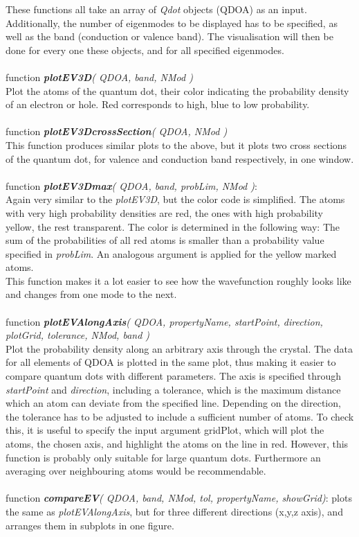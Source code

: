 These functions all take an array of \textit{Qdot} objects (QDOA) as an input. Additionally, the number of eigenmodes to be displayed has to be specified, as well as the band (conduction or valence band). The visualisation will then be done for every one these objects, and for all specified eigenmodes.
\\\\
function \textit{\textbf{plotEV3D}( QDOA, band, NMod )} \\
Plot the atoms of the quantum dot, their color indicating the probability density of an electron or hole. Red corresponds to high, blue to low probability.
\\\\
function \textit{\textbf{plotEV3DcrossSection}( QDOA, NMod ) }\\
This function produces similar plots to the above, but it plots two cross sections of the quantum dot, for valence and conduction band respectively, in one window.
\\\\
function \textit{\textbf{plotEV3Dmax}( QDOA, band, probLim, NMod )}: \\
Again very similar to the \textit{plotEV3D}, but the color code is simplified. The atoms with very high probability densities are red, the ones with high probability yellow, the rest transparent. The color is determined in the following way: The sum of the probabilities of all red atoms is smaller than a probability value specified in \textit{probLim}. An analogous argument is applied for the yellow marked atoms.\\
This function makes it a lot easier to see how the wavefunction roughly looks like and changes from one mode to the next. 
\\\\
function \textit{\textbf{plotEVAlongAxis}( QDOA, propertyName, startPoint, direction, plotGrid, tolerance, NMod, band )}\\
Plot the probability density along an arbitrary axis through the crystal. The data for all elements of QDOA is plotted in the same plot, thus making it easier to compare quantum dots with different parameters. The axis is specified through \textit{startPoint} and \textit{direction}, including a tolerance, which is the maximum distance which an atom can deviate from the specified line. Depending on the direction, the tolerance has to be adjusted to include a sufficient number of atoms. To check this, it is useful to specify the input argument gridPlot, which will plot the atoms, the chosen axis, and highlight the atoms on the line in red. However, this function is probably only suitable for large quantum dots. Furthermore an averaging over neighbouring atoms would be recommendable.
\\\\
function \textit{\textbf{compareEV}( QDOA, band, NMod, tol, propertyName, showGrid)}: plots the same as \textit{plotEVAlongAxis}, but for three different directions (x,y,z axis), and arranges them in subplots in one figure.













